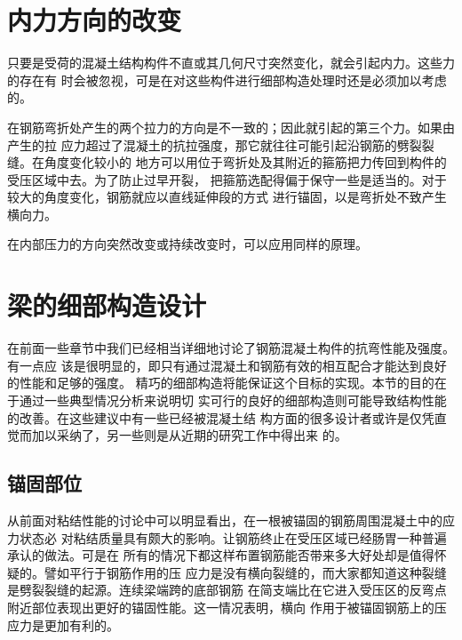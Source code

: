 \documentclass[12pt,a4paper]{book}
\begin{document}
\section{内力方向的改变}

只要是受荷的混凝土结构构件不直或其几何尺寸突然变化，就会引起内力。这些力的存在有
时会被忽视，可是在对这些构件进行细部构造处理时还是必须加以考虑的。

在钢筋弯折处产生的两个拉力的方向是不一致的；因此就引起的第三个力。如果由产生的拉
应力超过了混凝土的抗拉强度，那它就往往可能引起沿钢筋的劈裂裂缝。在角度变化较小的
地方可以用位于弯折处及其附近的箍筋把力传回到构件的受压区域中去。为了防止过早开裂，
把箍筋选配得偏于保守一些是适当的。对于较大的角度变化，钢筋就应以直线延伸段的方式
进行锚固，以是弯折处不致产生横向力。

在内部压力的方向突然改变或持续改变时，可以应用同样的原理。

\section{梁的细部构造设计}

在前面一些章节中我们已经相当详细地讨论了钢筋混凝土构件的抗弯性能及强度。有一点应
该是很明显的，即只有通过混凝土和钢筋有效的相互配合才能达到良好的性能和足够的强度。
精巧的细部构造将能保证这个目标的实现。本节的目的在于通过一些典型情况分析来说明切
实可行的良好的细部构造则可能导致结构性能的改善。在这些建议中有一些已经被混凝土结
构方面的很多设计者或许是仅凭直觉而加以采纳了，另一些则是从近期的研究工作中得出来
的。

\subsection{锚固部位}

从前面对粘结性能的讨论中可以明显看出，在一根被锚固的钢筋周围混凝土中的应力状态必
对粘结质量具有颇大的影响。让钢筋终止在受压区域已经肠胃一种普遍承认的做法。可是在
所有的情况下都这样布置钢筋能否带来多大好处却是值得怀疑的。譬如平行于钢筋作用的压
应力是没有横向裂缝的，而大家都知道这种裂缝是劈裂裂缝的起源。连续梁端跨的底部钢筋
在简支端比在它进入受压区的反弯点附近部位表现出更好的锚固性能。这一情况表明，横向
作用于被锚固钢筋上的压应力是更加有利的。
\end{document}
